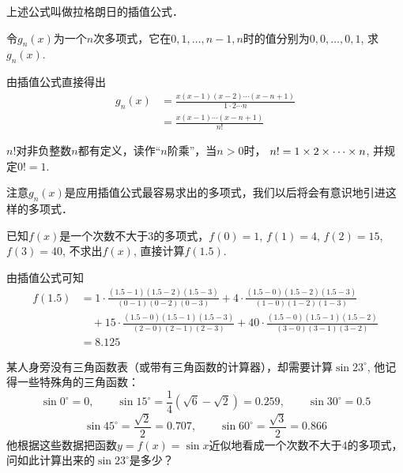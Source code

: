 上述公式叫做拉格朗日的插值公式．

\begin{example}
   令$g_n(x)$为一个$n$次多项式，它在$0, 1,\ldots,n-1,n $时的值分别为$0, 0,\ldots,0, 1$, 求$g_n(x)$. 
\end{example}

\begin{solution}
    由插值公式直接得出
    \[\begin{split}
        g_n(x)&=\frac{x(x-1)(x-2)\cdots(x-n+1)}{1\cdot 2\cdots n}\\
        &=\frac{x(x-1)\cdots(x-n+1)}{n!}      
    \end{split}\]

$n!$对非负整数$n$都有定义，读作“$n$阶乘”，当$n>0$时，
$n!=1\times2\times\cdots \times n$, 并规定$0!=1$.

注意$g_n(x)$是应用插值公式最容易求出的多项式，我们以后将会有意识地引进这样的多项式．
\end{solution}

\begin{example}
    已知$f(x)$是一个次数不大于3的多项式，$f(0)=1$, $f(1)=4$, $f(2)=15$, $f(3)=40$, 不求出$f(x)$, 直接计算$f(1.5)$.
\end{example}

\begin{solution}
    由插值公式可知
    \[\begin{split}
         f (1. 5) &=1\cdot \frac{(1. 5-1) (1.5-2)(1.5-3)}{(0-1) (0-2)(0-3)}+4\cdot \frac{(1.5-0)(1.5-2)(1.5-3)}{(1-0) (1-2)(1-3)}\\
         &\quad +15\cdot \frac{(1. 5-0) (1.5-1)(1.5-3)}{(2-0) (2-1)(2-3)} +40\cdot \frac{(1. 5-0) (1.5-1)(1.5-2)}{(3-0) (3-1)(3-2)}\\
         &=8.125
    \end{split}\]
\end{solution}
 

\begin{example}
某人身旁没有三角函数表（或带有三角函数的计算器），却需要计算$\sin23^{\circ}$, 他记得一些特殊角的三角函数：
\[\sin0^{\circ}=0,\qquad \sin15^{\circ}=\frac{1}{4} (\sqrt{6}-\sqrt{2}) =0. 259,\qquad \sin30^{\circ}=0.5\]
\[\sin45^{\circ}=\frac{\sqrt{2}}{2}=0. 707,\qquad \sin60^{\circ}=\frac{\sqrt{3}}{2}=0.866\]
他根据这些数据把函数$y=f(x)=\sin x$近似地看成一个次数不大于4的多项式，问如此计算出来的$\sin23^{\circ}$是多少？
\end{example}

